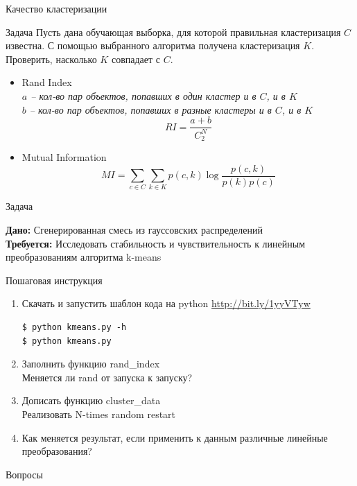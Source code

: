 \documentclass[10pt]{beamer}
\begin{document}
\begin{frame}{Качество кластеризации}

\begin{block}{Задача}
Пусть дана обучающая выборка, для которой правильная кластеризация $C$ известна. С помощью выбранного алгоритма получена кластеризация $K$. Проверить, насколько $K$ совпадает с $C$.
\end{block}

\begin{itemize}
\item Rand Index \\
{\it \small
$a$ -- кол-во пар объектов, попавших в один кластер и в $C$, и в $K$ \\
$b$ -- кол-во пар объектов, попавших в разные кластеры и в $C$, и в $K$
\[
RI = \frac{a+b}{C^N_2}
\]
}
\item Mutual Information \\
{\it \small
\[
MI = \sum_{c \in C} \sum_{k \in K} p(c, k) \log \frac{p(c, k)}{p(k)p(c)}
\]
}
\end{itemize}

\end{frame}

\begin{frame}[fragile]{Задача}

{\bf Дано:} Сгенерированная смесь из гауссовских распределений \\
{\bf Требуется:} Исследовать стабильность и чувствительность к линейным преобразованиям алгоритма k-means

\vspace{1em}
Пошаговая инструкция
\begin{enumerate}
\item Скачать и запустить шаблон кода на python \url{http://bit.ly/1yyVTyw}
\begin{shaded}
{\color{green} \begin{verbatim}
$ python kmeans.py -h
$ python kmeans.py 
\end{verbatim}}
\end{shaded}
\item Заполнить функцию \textsf{rand\_index} \\ Меняется ли rand от запуска к запуску?
\item Дописать функцию \textsf{cluster\_data} \\ Реализовать N-times random restart
\item Как меняется результат, если применить к данным различные линейные преобразования?
\end{enumerate}

\end{frame}


\begin{frame}[plain]
\begin{center}
{\Large Вопросы}
\end{center}
\end{frame}
\end{document}
